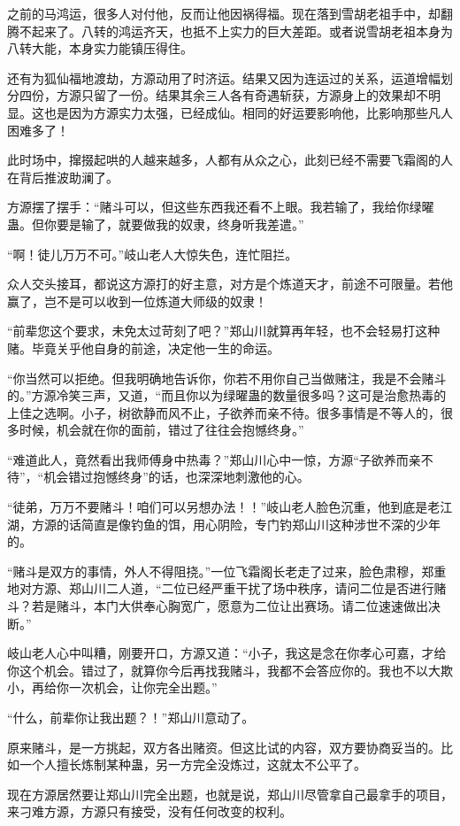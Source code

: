\begin{this_body}
之前的马鸿运，很多人对付他，反而让他因祸得福。现在落到雪胡老祖手中，却翻腾不起来了。八转的鸿运齐天，也抵不上实力的巨大差距。或者说雪胡老祖本身为八转大能，本身实力能镇压得住。

还有为狐仙福地渡劫，方源动用了时济运。结果又因为连运过的关系，运道增幅划分四份，方源只留了一份。结果其余三人各有奇遇斩获，方源身上的效果却不明显。这也是因为方源实力太强，已经成仙。相同的好运要影响他，比影响那些凡人困难多了！

此时场中，撺掇起哄的人越来越多，人都有从众之心，此刻已经不需要飞霜阁的人在背后推波助澜了。

方源摆了摆手：“赌斗可以，但这些东西我还看不上眼。我若输了，我给你绿曜蛊。但你要是输了，就要做我的奴隶，终身听我差遣。”

“啊！徒儿万万不可。”岐山老人大惊失色，连忙阻拦。

众人交头接耳，都说这方源打的好主意，对方是个炼道天才，前途不可限量。若他赢了，岂不是可以收到一位炼道大师级的奴隶！

“前辈您这个要求，未免太过苛刻了吧？”郑山川就算再年轻，也不会轻易打这种赌。毕竟关乎他自身的前途，决定他一生的命运。

“你当然可以拒绝。但我明确地告诉你，你若不用你自己当做赌注，我是不会赌斗的。”方源冷笑三声，又道，“而且你以为绿曜蛊的数量很多吗？这可是治愈热毒的上佳之选啊。小子，树欲静而风不止，子欲养而亲不待。很多事情是不等人的，很多时候，机会就在你的面前，错过了往往会抱憾终身。”

“难道此人，竟然看出我师傅身中热毒？”郑山川心中一惊，方源“子欲养而亲不待”，“机会错过抱憾终身”的话，也深深地刺激他的心。

“徒弟，万万不要赌斗！咱们可以另想办法！！”岐山老人脸色沉重，他到底是老江湖，方源的话简直是像钓鱼的饵，用心阴险，专门钓郑山川这种涉世不深的少年的。

“赌斗是双方的事情，外人不得阻挠。”一位飞霜阁长老走了过来，脸色肃穆，郑重地对方源、郑山川二人道，“二位已经严重干扰了场中秩序，请问二位是否进行赌斗？若是赌斗，本门大供奉心胸宽广，愿意为二位让出赛场。请二位速速做出决断。”

岐山老人心中叫糟，刚要开口，方源又道：“小子，我这是念在你孝心可嘉，才给你这个机会。错过了，就算你今后再找我赌斗，我都不会答应你的。我也不以大欺小，再给你一次机会，让你完全出题。”

“什么，前辈你让我出题？！”郑山川意动了。

原来赌斗，是一方挑起，双方各出赌资。但这比试的内容，双方要协商妥当的。比如一个人擅长炼制某种蛊，另一方完全没炼过，这就太不公平了。

现在方源居然要让郑山川完全出题，也就是说，郑山川尽管拿自己最拿手的项目，来刁难方源，方源只有接受，没有任何改变的权利。


\end{this_body}

